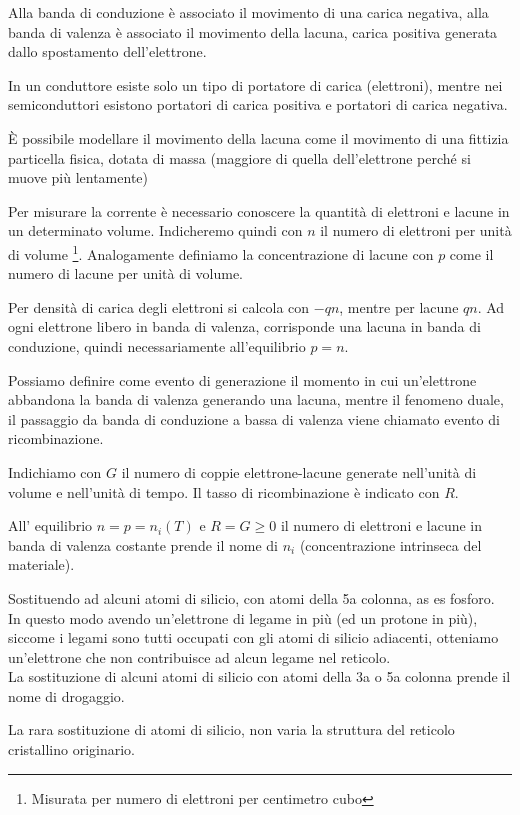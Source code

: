 \documentclass[../template]{subfiles}
\begin{document}
Alla banda di conduzione è associato il movimento di una carica negativa, alla banda di valenza è associato il movimento della lacuna, carica positiva generata dallo spostamento dell'elettrone.

In un conduttore esiste solo un tipo di portatore di carica (elettroni), mentre nei semiconduttori esistono portatori di carica positiva e portatori di carica negativa.

È possibile modellare il movimento della lacuna come il movimento di una fittizia particella fisica, dotata di massa (maggiore di quella dell'elettrone perché si muove più lentamente)

Per misurare la corrente è necessario conoscere la quantità di elettroni e lacune in un determinato volume.
Indicheremo quindi con $n$ il numero di elettroni per unità di volume \footnote{Misurata per numero di elettroni per centimetro cubo}.
Analogamente definiamo la concentrazione di lacune con $p$ come il numero di lacune per unità di volume.

Per densità di carica degli elettroni si calcola con $-qn$, mentre per lacune $qn$.
Ad ogni elettrone libero in banda di valenza, corrisponde una lacuna in banda di conduzione, quindi necessariamente all'equilibrio $p = n$.

Possiamo definire come evento di generazione il momento in cui un'elettrone abbandona la banda di valenza generando una lacuna, mentre il fenomeno duale, il passaggio da banda di conduzione a bassa di valenza viene chiamato evento di ricombinazione.

Indichiamo con $G$ il numero di coppie elettrone-lacune generate nell'unità di volume e nell'unità di tempo. Il tasso di ricombinazione è indicato con $R$.

All' equilibrio $n = p = n_i(T)$ e $R = G\ge 0$ il numero di elettroni e lacune in banda di valenza costante prende il nome di $n_i$ (concentrazione intrinseca del materiale).

Sostituendo ad alcuni atomi di silicio, con atomi della 5a colonna, as es fosforo. In questo modo avendo un'elettrone di legame in più (ed un protone in più), siccome i legami sono tutti occupati con gli atomi di silicio adiacenti, otteniamo un'elettrone che non contribuisce ad alcun legame nel reticolo.
\\
La sostituzione di alcuni atomi di silicio con atomi della 3a o 5a colonna prende il nome di drogaggio.

La rara sostituzione di atomi di silicio, non varia la struttura del reticolo cristallino originario.
\end{document}
